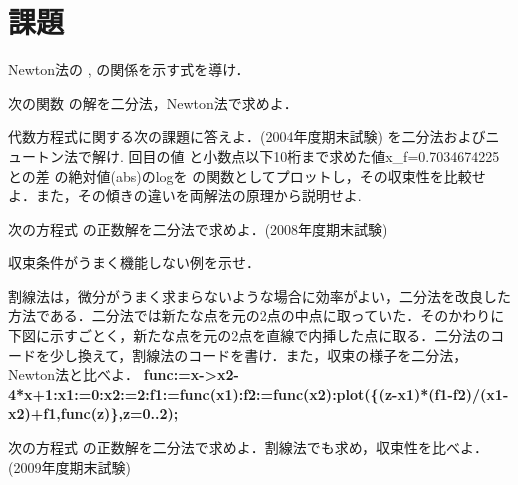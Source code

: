 \documentclass{article}
\begin{document}
\section{\textbf{課題}}
\begin{maplegroup}
Newton法の
,
の関係を示す式を導け．
\end{maplegroup}
\begin{maplegroup}
次の関数
の解を二分法，Newton法で求めよ．
\end{maplegroup}
\begin{maplegroup}
代数方程式に関する次の課題に答えよ．(2004年度期末試験)
を二分法およびニュートン法で解け.
回目の値
と小数点以下10桁まで求めた値x\_f=0.7034674225との差
の絶対値(abs)のlogを
の関数としてプロットし，その収束性を比較せよ．また，その傾きの違いを両解法の原理から説明せよ.\end{maplegroup}
\begin{maplegroup}
次の方程式
の正数解を二分法で求めよ．(2008年度期末試験)
\end{maplegroup}
\begin{maplegroup}
収束条件がうまく機能しない例を示せ．
\end{maplegroup}
\begin{maplegroup}
割線法は，微分がうまく求まらないような場合に効率がよい，二分法を改良した方法である．二分法では新たな点を元の2点の中点に取っていた．そのかわりに下図に示すごとく，新たな点を元の2点を直線で内挿した点に取る．二分法のコードを少し換えて，割線法のコードを書け．また，収束の様子を二分法，Newton法と比べよ．
\textbf{func:=x->x2-4*x+1:}\textbf{x1:=0:}\textbf{x2:=2:}\textbf{f1:=func(x1):}\textbf{f2:=func(x2):}\textbf{plot(\{(z-x1)*(f1-f2)/(x1-x2)+f1,func(z)\},z=0..2);}\mapleresult
{}
\end{maplegroup}
\begin{maplegroup}
次の方程式
の正数解を二分法で求めよ．割線法でも求め，収束性を比べよ．(2009年度期末試験)
\end{maplegroup}
\end{document}
